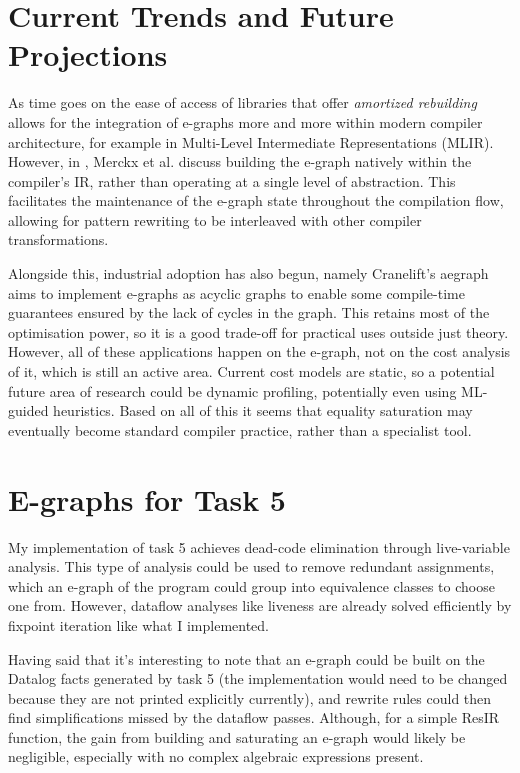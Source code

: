 \documentclass[11pt, a4paper]{article}
\begin{document}
\section{Current Trends and Future Projections}

As time goes on the ease of access of libraries that offer \emph{amortized rebuilding} allows for the integration of e-graphs more and more within modern compiler architecture, 
for example in Multi-Level Intermediate Representations (MLIR). However, in \cite{merckx2026}, Merckx et al. discuss building the e-graph natively within the compiler's IR,
rather than operating at a single level of abstraction. This facilitates the maintenance of the e-graph state throughout the compilation flow, allowing for pattern rewriting
to be interleaved with other compiler transformations.

\smallskip

Alongside this, industrial adoption has also begun, namely Cranelift's aegraph \cite{fallin2026} aims to implement e-graphs as acyclic graphs to enable some compile-time guarantees ensured by
the lack of cycles in the graph. This retains most of the optimisation power, so it is a good trade-off for practical uses outside just theory. However, all of these applications
happen on the e-graph, not on the cost analysis of it, which is still an active area. Current cost models are static, so a potential future area of research could be dynamic 
profiling, potentially even using ML-guided heuristics. Based on all of this it seems that equality saturation may eventually become standard compiler practice, rather than a
specialist tool.

\section{E-graphs for Task 5}

My implementation of task 5 achieves dead-code elimination through live-variable analysis. This type of analysis could be used to remove redundant assignments, 
which an e-graph of the program could group into equivalence classes to choose one from. However, dataflow analyses like liveness are already solved efficiently
by fixpoint iteration like what I implemented.

\smallskip

Having said that it's interesting to note that an e-graph could be built on the Datalog facts generated by task 5 (the implementation would need to be changed
because they are not printed explicitly currently),  and rewrite rules could then find simplifications missed by the dataflow passes. Although, for a simple ResIR function,
the gain from building and saturating an e-graph would likely be negligible, especially with no complex algebraic expressions present.
\end{document}
